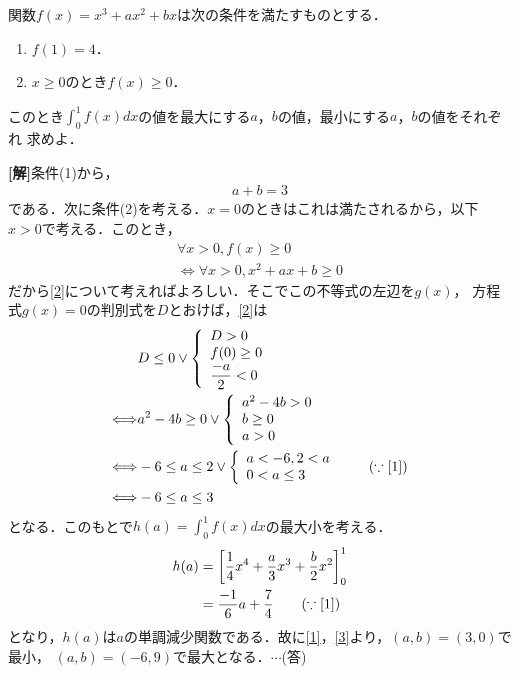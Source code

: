 \documentclass[a4j]{jarticle}
\begin{document}

     \begin{oframed}
     関数$f(x)=x^3+ax^2+bx$は次の条件を満たすものとする．
          \begin{enumerate}[(1)]
          \item $f(1)=4$．
          \item $x\ge0$のとき$f(x)\ge0$．
          \end{enumerate}
     このとき$\int_0^1f(x)dx$の値を最大にする$a$，$b$の値，最小にする$a$，$b$の値をそれぞれ
     求めよ．     
     \end{oframed}

\setlength{\columnseprule}{0.4pt}
\begin{multicols}{2}
{\bf[解]}条件(1)から，
     \begin{align}
     a+b=3 \label{1}
     \end{align}
である．次に条件(2)を考える．$x=0$のときはこれは満たされるから，以下$x>0$で考える．このとき，
     \begin{align}
     \forall x>0,f(x)\ge0 \nonumber\\
     \Longleftrightarrow \forall x>0,x^2+ax+b\ge0 \label{2}
     \end{align}     
だから\eqref{2}について考えればよろしい．そこでこの不等式の左辺を$g(x)$，
方程式$g(x)=0$の判別式を$D$とおけば，\eqref{2}は
     \begin{align}
     &D\le0 \lor
     \left\{
          \begin{array}{l}
          D>0  \\
          f(0)\ge0 \\
          \dfrac{-a}{2}< 0
          \end{array}
     \right.     \nonumber\\
     \Longleftrightarrow
     &a^2-4b\ge0 \lor
     \left\{
          \begin{array}{l}
          a^2-4b>0  \\
          b\ge0 \\
          a>0
          \end{array}
     \right.     \nonumber\\
     \Longleftrightarrow
     &-6\le a\le2 \lor
     \left\{
          \begin{array}{l}
          a<-6,2<a  \\
          0<a\le3
          \end{array}
     \right.  \tag{$\because\eqref{1}$} \\
          \Longleftrightarrow
     &-6\le a\le 3 \label{3}
     \end{align}
となる．このもとで$h(a)=\int_0^1f(x)dx$の最大小を考える．
     \begin{align*}
     h(a)&=\left[ \frac{1}{4}x^4+\frac{a}{3}x^3+\frac{b}{2}x^2\right]_0^1 \\
     &=\frac{-1}{6}a+\frac{7}{4}\tag{$\because\eqref{1}$}
     \end{align*}
となり，$h(a)$は$a$の単調減少関数である．故に\eqref{1}，\eqref{3}より，$(a,b)=(3,0)$で最小，
$(a,b)=(-6,9)$で最大となる．$\cdots$(答)          
\newpage
\end{multicols}
\end{document}
